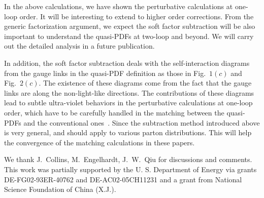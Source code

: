 \documentclass[aps,prd,preprint,tightenlines,superscriptaddress,nofootinbib]{revtex4}
\begin{document}
In the above calculations, we have shown the perturbative calculations at one-loop
order. It will be interesting to extend to higher order corrections. From the generic factorization
argument, we expect the soft factor subtraction will be also important 
to understand the quasi-PDFs at two-loop and beyond. We will carry 
out the detailed analysis in a future publication.

In addition, the soft factor subtraction deals with the self-interaction 
diagrams from the gauge links in the quasi-PDF definition as those
in Fig.~$1(c )$ and Fig.~$2(c )$. The existence
of these diagrams come from the fact that the gauge links are along the
non-light-like directions. The contributions of these diagrams lead to
subtle ultra-violet behaviors in the perturbative calculations at one-loop order,
which have to be carefully handled in the matching between the quasi-PDFs and
the conventional ones~\cite{Xiong:2013bka,Lin:2014zya,Ma:2014jla}.
Since the subtraction method introduced above is very general, and should apply to 
various parton distributions.
This will help the convergence of the matching calculations in
these papers.

We thank J.~Collins, M.~Engelhardt, J.~W.~Qiu for discussions and comments.
This work was partially supported by the U.
S. Department of Energy via grants DE-FG02-93ER-40762
and DE-AC02-05CH11231 and a grant from National Science Foundation of China (X.J.).
\end{document}
